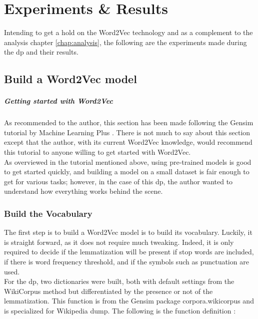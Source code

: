

\chapter{Experiments \& Results}
\label{chap:experiments-results}
Intending to get a hold on the Word2Vec technology and as a complement to the analysis chapter \ref{chap:analysis}, the following are the experiments made during the \gls{dp} and their results.

\section{Build a Word2Vec model}
\paragraph{Getting started with Word2Vec}
As recommended to the author, this section has been made following the Gensim tutorial by Machine Learning Plus \cite{article:gensim-tutorial}. There is not much to say about this section except that the author, with its current Word2Vec knowledge, would recommend this tutorial to anyone willing to get started with Word2Vec. \\

As overviewed in the tutorial mentioned above, using pre-trained models is good to get started quickly, and building a model on a small dataset is fair enough to get for various tasks; however, in the case of this \gls{dp}, the author wanted to understand how everything works behind the scene.

\subsection{Build the Vocabulary}
The first step is to build a Word2Vec model is to build its vocabulary. Luckily, it is straight forward, as it does not require much tweaking. Indeed, it is only required to decide if the lemmatization will be present if stop words are included, if there is word frequency threshold, and if the symbols such as punctuation are used.\\

For the \gls{dp}, two dictionaries were built, both with default settings from the WikiCorpus method but differentiated by the presence or not of the lemmatization. This function is from the Gensim package corpora.wikicorpus and is specialized for Wikipedia dump. The following is the function definition \cite{article:gensim-api}:

